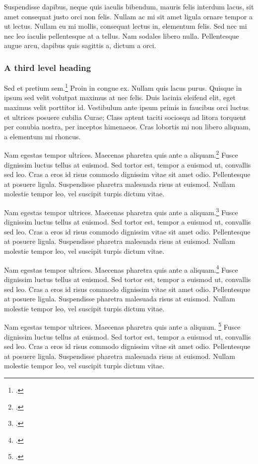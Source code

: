 \documentclass[law]{crclart}
\begin{document}
Suspendisse dapibus, neque quis iaculis bibendum, mauris felis interdum lacus,
sit amet consequat justo orci non felis. Nullam ac mi sit amet ligula ornare
tempor a ut lectus. Nullam eu mi mollis, consequat lectus in, elementum felis.
Sed nec mi nec leo iaculis pellentesque at a tellus. Nam sodales libero nulla.
Pellentesque augue arcu, dapibus quis sagittis a, dictum a orci.

\subsubsection{A third level heading}

Sed et pretium sem.\footcite{Ihde_1990} Proin in congue ex. Nullam quis lacus purus.
Quisque in ipsum sed velit volutpat maximus at nec felis. Duis
lacinia eleifend elit, eget maximus velit porttitor id. Vestibulum ante ipsum
primis in faucibus orci luctus et ultrices posuere cubilia Curae; Class aptent
taciti sociosqu ad litora torquent per conubia nostra, per inceptos himenaeos.
Cras lobortis mi non libero aliquam, a elementum mi rhoncus.

Nam egestas tempor ultrices. Maecenas pharetra quis ante a
aliquam.\footcite{Vismann_Krajewski_2007} Fusce dignissim luctus tellus at euismod.
Sed tortor est, tempor a euismod ut, convallis sed leo. Cras a eros id risus
commodo dignissim vitae sit amet odio. Pellentesque at posuere ligula.
Suspendisse pharetra malesuada risus at euismod. Nullam molestie tempor leo, vel
suscipit turpis dictum vitae.

Nam egestas tempor ultrices. Maecenas pharetra quis ante a
aliquam.\footcite{Vismann_Krajewski_2007} Fusce dignissim luctus tellus at euismod.
Sed tortor est, tempor a euismod ut, convallis sed leo. Cras a eros id risus
commodo dignissim vitae sit amet odio. Pellentesque at posuere ligula.
Suspendisse pharetra malesuada risus at euismod. Nullam molestie tempor leo, vel
suscipit turpis dictum vitae.

Nam egestas tempor ultrices. Maecenas pharetra quis ante a
aliquam.\footcite{Vismann_Krajewski_2007} Fusce dignissim luctus tellus at euismod.
Sed tortor est, tempor a euismod ut, convallis sed leo. Cras a eros id risus
commodo dignissim vitae sit amet odio. Pellentesque at posuere ligula.
Suspendisse pharetra malesuada risus at euismod. Nullam molestie tempor leo, vel
suscipit turpis dictum vitae.


\printbibliography


\lipsum[6-9]

Nam egestas tempor ultrices. Maecenas pharetra quis ante a
aliquam. \footcite{Vismann_Krajewski_2007} Fusce dignissim luctus tellus at euismod.
Sed tortor est, tempor a euismod ut, convallis sed leo. Cras a eros id risus
commodo dignissim vitae sit amet odio. Pellentesque at posuere ligula.
Suspendisse pharetra malesuada risus at euismod. Nullam molestie tempor leo, vel
suscipit turpis dictum vitae.

\printbibliography

\response{}

\lipsum[56-59]
\end{document}
